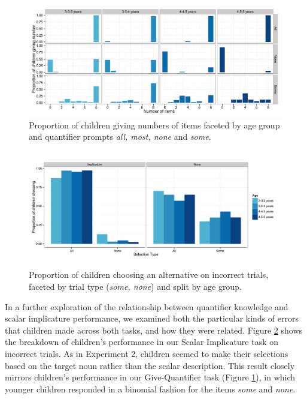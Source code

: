 \documentclass[man]{apa2}
\begin{document}
\begin{figure} 
 \begin{center} 
  \includegraphics[width = \textwidth]{figures/exp3_GQspread.pdf} 
  \caption{\label{fig:GQ_spread} Proportion of children giving numbers of items faceted by age group and quantifier prompts \textit{all, most, none} and \textit{some}.} 
 \end{center} 
\end{figure}


\begin{figure} 
 \begin{center} 
  \includegraphics[height=2in]{figures/exp3_wrong.pdf} 
  \caption{\label{fig:exp3_wrong} Proportion of children choosing an alternative on incorrect trials, faceted by trial type (\textit{some, none}) and split by age group.} 
 \end{center} 
\end{figure}

In a further exploration of the relationship between quantifier knowledge and scalar implicature performance, we examined both the particular kinds of errors that children made across both tasks, and how they were related. Figure \ref{fig:exp3_wrong} shows the breakdown of children's performance in our Scalar Implicature task on incorrect trials. As in Experiment 2, children seemed to make their selections based on the target noun rather than the scalar description. This result closely mirrors children's performance in our Give-Quantifier task (Figure \ref{fig:GQ_spread}), in which younger children responded in a binomial fashion for the items \textit{some} and \textit{none}. 
\end{document}
